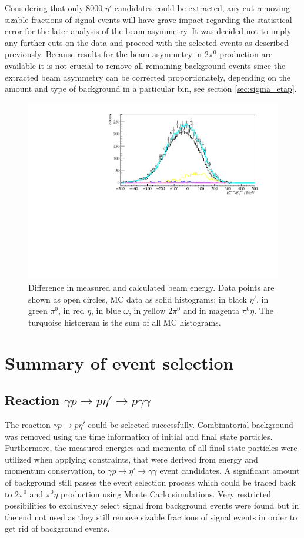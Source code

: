 \noindent Considering that only 8000 $\eta'$ candidates could be extracted, any cut removing sizable fractions of signal events will have grave impact regarding the statistical error for the later analysis of the beam asymmetry. It was decided not to imply any further cuts on the data and proceed with the selected events as described previously. Because results for the beam asymmetry in $2\pi^0$ production are available \cite{mahlbergphd} it is not crucial to remove all remaining background events since the extracted beam asymmetry can be corrected proportionately, depending on the amount and type of background in a particular bin, see section \ref{sec:sigma_etap}. 
\begin{figure}[htbp]
	\centering
	\includegraphics[width=\linewidth]{../figs/hydrogen/calc_beam.pdf}
	\caption{Difference in measured and calculated beam energy. Data points are shown as open circles, MC data as solid histograms: in black $\eta'$, in green $\pi^0$, in red $\eta$, in blue $\omega$, in yellow $2\pi^0$ and in magenta $\pi^0\eta$. The turquoise histogram is the sum of all MC histograms.}
	\label{fig:beame}
\end{figure}

\section{Summary of event selection}
\subsection{Reaction $\gamma p\to p\eta'\to p\gamma\gamma$}
The reaction $\gamma p\to p\eta'$ could be selected successfully. Combinatorial background was removed using the time information of initial and final state particles. Furthermore, the measured energies and momenta of all final state particles were utilized when applying constraints, that were derived from energy and momentum conservation, to $\gamma p\to\eta'\to\gamma\gamma$ event candidates. A significant amount of background still passes the event selection process which could be traced back to $2\pi^0$ and $\pi^0\eta$ production using Monte Carlo simulations. Very restricted possibilities to exclusively select signal from background events were found but in the end not used as they still remove sizable fractions of signal events in order to get rid of background events.

